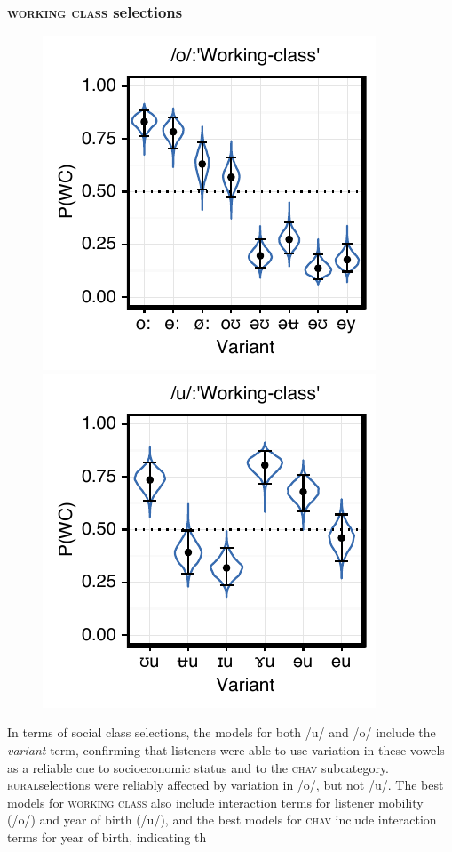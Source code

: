 \documentclass[PWPL]{article}
\begin{document}
\subsubsection{\textsc{working class} selections}
\begin{figure}[H]
\centering
\includegraphics[scale=0.8]{ow_class.pdf}
\includegraphics[scale=0.8]{uw_class.pdf}
\end{figure}
In terms of social class selections, the models for both /u/ and /o/ include the \textit{variant} term, confirming that listeners were able to use variation in these vowels as a reliable cue to socioeconomic status and to the \textsc{chav} subcategory. \textsc{rural}selections were reliably affected by variation in /o/, but not /u/. The best models for \textsc{working class} also include interaction terms for listener mobility (/o/) and year of birth (/u/), and the best models for \textsc{chav} include interaction terms for year of birth, indicating th
\end{document}
